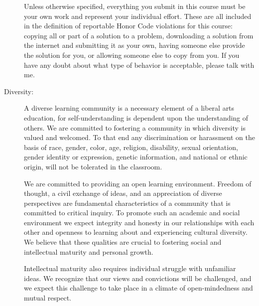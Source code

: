 \documentclass [letterpaper,11pt]{article}
\begin{document}
\begin{description}
Unless otherwise specified, everything you submit in this course must be your own work and represent
your individual effort.  These are all included in the definition of reportable Honor Code violations for this course:
copying all or part of a solution to a problem, downloading a solution from the internet and submitting it as your own, having someone else provide the solution for you, or allowing someone else to copy from you.	If you have any doubt about what type of behavior is acceptable, please talk with me.

\item[Diversity:]
A diverse learning community is a necessary element of a liberal arts education, for self-understanding is dependent upon the understanding of others. 
We are committed to fostering a community in which diversity is valued and welcomed. To that end any discrimination or 
harassment on the basis of race, gender, color, age, religion, disability, sexual orientation, gender identity or expression, genetic information, and national or ethnic origin, will not be tolerated in the classroom.

We are committed to providing an open learning environment. Freedom of thought, a civil exchange of ideas, and an appreciation of diverse perspectives are fundamental characteristics of a community that is committed to critical inquiry. To promote such an academic and social environment we expect integrity and honesty in our relationships with each other and openness to learning about and experiencing cultural diversity. We believe that these qualities are crucial to fostering social and intellectual maturity and personal growth.

Intellectual maturity also requires individual struggle with unfamiliar ideas. We recognize that our views and convictions will be challenged, and we expect this challenge to take place in a climate of open-mindedness and mutual respect.


\end{description}
\end{document}
